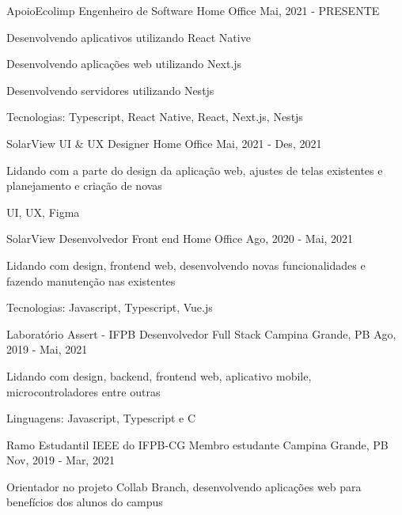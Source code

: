 
\begin{cventries}
  \cventry
  {ApoioEcolimp} %
  {Engenheiro de Software} %
  {Home Office} %
  {Mai, 2021 - PRESENTE} %
  {
    \begin{cvitems} %
      \item {Desenvolvendo aplicativos utilizando React Native}
      \item {Desenvolvendo aplicações web utilizando Next.js}
      \item {Desenvolvendo servidores utilizando Nestjs}
      \item {Tecnologias: Typescript, React Native, React, Next.js, Nestjs}
    \end{cvitems}
  }

  \cventry
    {SolarView}
    {UI \& UX Designer}
    {Home Office}
    {Mai, 2021 - Des, 2021}
    {
      \begin{cvitems}
        \item {Lidando com a parte do design da aplicação web, ajustes de telas existentes e planejamento e criação de novas}
        \item {UI, UX, Figma}
      \end{cvitems}
    }

  \cventry
    {SolarView}
    {Desenvolvedor Front end}
    {Home Office}
    {Ago, 2020 - Mai, 2021}
    {
      \begin{cvitems}
        \item {Lidando com design, frontend web, desenvolvendo novas funcionalidades e fazendo manutenção nas existentes}
        \item {Tecnologias: Javascript, Typescript, Vue.js}
      \end{cvitems}
    }

  \cventry
    {Laboratório Assert - IFPB}
    {Desenvolvedor Full Stack}
    {Campina Grande, PB}
    {Ago, 2019 - Mai, 2021}
    {
      \begin{cvitems}
        \item {Lidando com design, backend, frontend web, aplicativo mobile, microcontroladores entre outras}
        \item {Linguagens: Javascript, Typescript e C}
      \end{cvitems}
    }

  \cventry
    {Ramo Estudantil IEEE do IFPB-CG}
    {Membro estudante}
    {Campina Grande, PB}
    {Nov, 2019 - Mar, 2021}
    {
      \begin{cvitems}
        \item {Orientador no projeto Collab Branch, desenvolvendo aplicações web para benefícios dos alunos do campus}
      \end{cvitems}
    }
    

\end{cventries}
